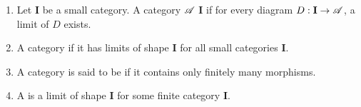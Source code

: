 \begin{definition}
    \begin{enumerate}[label=(\alph*)]
        \item Let $\mathbf{I}$ be a small category. A category $\mathscr A$  $\mathbf I$ if for every diagram $D:\mathbf I\to\mathscr A$, a limit of $D$ exists. 
        \item A category  if it has limits of shape $\mathbf I$ for all small categories $\mathbf I$.
        \item A category is said to be  if it contains only finitely many morphisms. 
        \item A  is a limit of shape $\mathbf{I}$ for some finite category $\mathbf{I}$.
    \end{enumerate}
\end{definition}

